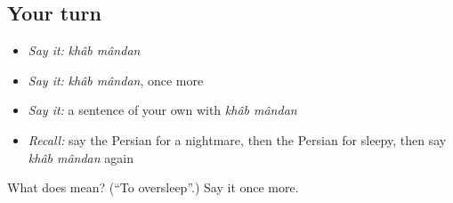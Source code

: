\subsection*{Your turn}
\begin{itemize}
\raggedright
  \item \emph{Say it:} \emph{khâb mândan}
  \item \emph{Say it:} \emph{khâb mândan}, once more
  \item \emph{Say it:} a sentence of your own with \emph{khâb mândan}
  \item \emph{Recall:} say the Persian for a nightmare, then the Persian for sleepy, then say \emph{khâb mândan} again
\end{itemize}

\begin{tcolorbox}[breakable,colback=teal!4,colframe=teal!35!black,title={Before you move on}]
What does   mean? (\textquotedblleft{}To oversleep\textquotedblright{}.) Say it once more.
\end{tcolorbox}
